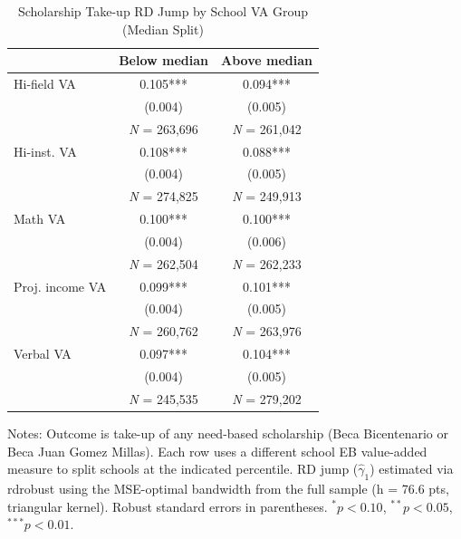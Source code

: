 \begin{table}[!htbp]
\centering
\caption{Scholarship Take-up RD Jump by School VA Group (Median Split)}
\label{tab:any-scholarship-rd-p50-split}
\begin{tabular}{lcc}
\toprule
 & Below median & Above median \\
\midrule
Hi-field VA & 0.105*** & 0.094*** \\
 & (0.004) & (0.005) \\
 & \multicolumn{1}{c}{\textit{N} = 263,696} & \multicolumn{1}{c}{\textit{N} = 261,042} \\[4pt]
Hi-inst. VA & 0.108*** & 0.088*** \\
 & (0.004) & (0.005) \\
 & \multicolumn{1}{c}{\textit{N} = 274,825} & \multicolumn{1}{c}{\textit{N} = 249,913} \\[4pt]
Math VA & 0.100*** & 0.100*** \\
 & (0.004) & (0.006) \\
 & \multicolumn{1}{c}{\textit{N} = 262,504} & \multicolumn{1}{c}{\textit{N} = 262,233} \\[4pt]
Proj. income VA & 0.099*** & 0.101*** \\
 & (0.004) & (0.005) \\
 & \multicolumn{1}{c}{\textit{N} = 260,762} & \multicolumn{1}{c}{\textit{N} = 263,976} \\[4pt]
Verbal VA & 0.097*** & 0.104*** \\
 & (0.004) & (0.005) \\
 & \multicolumn{1}{c}{\textit{N} = 245,535} & \multicolumn{1}{c}{\textit{N} = 279,202} \\[4pt]
\bottomrule
\end{tabular}
\par\medskip\footnotesize
\begin{minipage}{\textwidth}
Notes: Outcome is take-up of any need-based scholarship (Beca Bicentenario or Beca Juan Gomez Millas). Each row uses a different school EB value-added measure to split schools at the indicated percentile. RD jump ($\hat{\gamma}_1$) estimated via rdrobust using the MSE-optimal bandwidth from the full sample (h = 76.6 pts, triangular kernel). Robust standard errors in parentheses. $^{*}p<0.10$, $^{**}p<0.05$, $^{***}p<0.01$.
\end{minipage}
\end{table}
